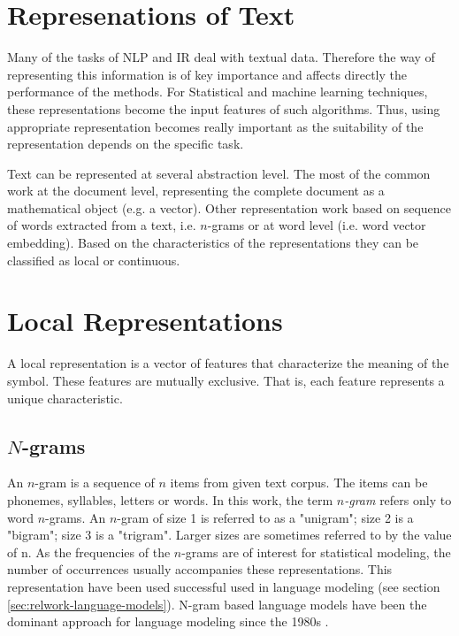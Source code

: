 \section{Represenations of Text}
 \label{sec:rel_represenation_text}
  Many of the tasks of \ac{NLP} and \ac{IR} deal with textual data. Therefore
  the way  of representing this information is of key importance and affects
  directly the performance of the methods.  For  Statistical and machine
  learning techniques, these representations become the input features of
  such algorithms. Thus, using appropriate representation  becomes really
  important as the suitability of the representation  depends on the specific
  task.
  
  Text can be represented at several abstraction level.  The most of the
  common work at the document level, representing the complete document as a
  mathematical object (e.g. a vector). Other representation work based on
  sequence of words extracted from a text, i.e. $n$-grams or at word level
  (i.e. word vector embedding). Based on the characteristics of the
  representations they can be classified as local or continuous. 
 
  

\section{Local Representations}
 \label{sec:rel_local_representation}
A local representation is a vector of features that characterize the meaning
of the symbol. These features are mutually exclusive. That is, each feature
represents a unique characteristic.

\subsection{$N$-grams}
 \label{sec:sub_ngrams}

An $n$-gram is a sequence of $n$ items from given text corpus. The items can
be phonemes, syllables, letters or words. In this  work, the term
\textit{$n$-gram} refers only   to  word $n$-grams.
An $n$-gram of size 1 is referred to as a "unigram"; size 2 is a "bigram";
size 3 is a "trigram". Larger sizes are sometimes referred to by the value of
n. As the frequencies of the $n$-grams are of interest for statistical
modeling, the number of occurrences usually accompanies these
representations. This representation  have been used successful used in language modeling (see section
\ref{sec:relwork-language-models}). N-gram based language models have been  the dominant approach for
 language modeling since the 1980s \cite{Bengio:2008}.


